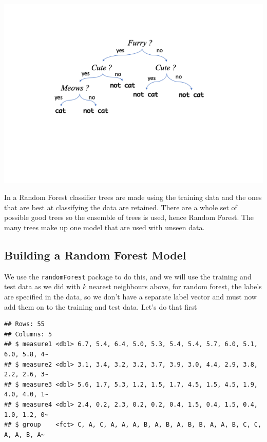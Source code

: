 \documentclass[
]{book}
\newenvironment{Shaded}{\begin{snugshade}}{\end{snugshade}}
\newcommand{\KeywordTok}[1]{\textcolor[rgb]{0.13,0.29,0.53}{\textbf{#1}}}
\newcommand{\NormalTok}[1]{#1}
\newcommand{\OperatorTok}[1]{\textcolor[rgb]{0.81,0.36,0.00}{\textbf{#1}}}
\newcommand{\StringTok}[1]{\textcolor[rgb]{0.31,0.60,0.02}{#1}}
\begin{document}
\includegraphics{figs/dt.png}

In a Random Forest classifier trees are made using the training data and the ones that are best at classifying the data are retained. There are a whole set of possible good trees so the ensemble of trees is used, hence Random Forest. The many trees make up one model that are used with unseen data.

\hypertarget{building-a-random-forest-model}{%
\subsection{Building a Random Forest Model}\label{building-a-random-forest-model}}

We use the \texttt{randomForest} package to do this, and we will use the training and test data as we did with \(k\) nearest neighbours above, for random forest, the labels are specified in the data, so we don't have a separate label vector and must now add them on to the training and test data. Let's do that first

\begin{Shaded}
\end{Shaded}

\begin{verbatim}
## Rows: 55
## Columns: 5
## $ measure1 <dbl> 6.7, 5.4, 6.4, 5.0, 5.3, 5.4, 5.4, 5.7, 6.0, 5.1, 6.0, 5.8, 4~
## $ measure2 <dbl> 3.1, 3.4, 3.2, 3.2, 3.7, 3.9, 3.0, 4.4, 2.9, 3.8, 2.2, 2.6, 3~
## $ measure3 <dbl> 5.6, 1.7, 5.3, 1.2, 1.5, 1.7, 4.5, 1.5, 4.5, 1.9, 4.0, 4.0, 1~
## $ measure4 <dbl> 2.4, 0.2, 2.3, 0.2, 0.2, 0.4, 1.5, 0.4, 1.5, 0.4, 1.0, 1.2, 0~
## $ group    <fct> C, A, C, A, A, A, B, A, B, A, B, B, A, A, B, C, C, A, A, B, A~
\end{verbatim}
\end{document}
